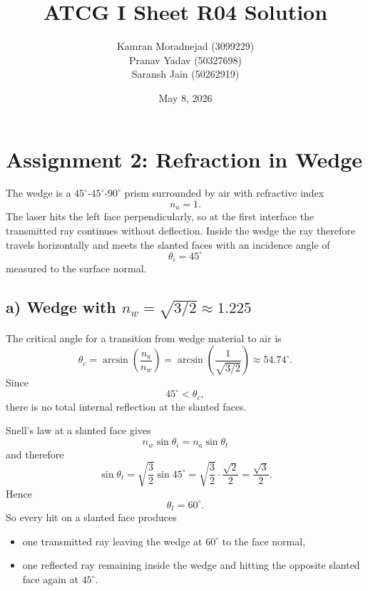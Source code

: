 \documentclass[a4paper,11pt]{article}
\title{ATCG I Sheet R04 Solution}
\author{
\large Kamran Moradnejad (3099229) \\
\large Pranav Yadav (50327698) \\
\large Saransh Jain (50262919)
}
\date{May 8, 2026}
\begin{document}
\maketitle

\section*{Assignment 2: Refraction in Wedge}
The wedge is a $45^\circ$-$45^\circ$-$90^\circ$ prism surrounded by air with refractive index
\[
n_a = 1.
\]
The laser hits the left face perpendicularly, so at the first interface the transmitted ray continues without deflection. Inside the wedge the ray therefore travels horizontally and meets the slanted faces with an incidence angle of
\[
\theta_i = 45^\circ
\]
measured to the surface normal.

\subsection*{a) Wedge with $n_w = \sqrt{3/2} \approx 1.225$}
The critical angle for a transition from wedge material to air is
\[
\theta_c = \arcsin\left(\frac{n_a}{n_w}\right)
= \arcsin\left(\frac{1}{\sqrt{3/2}}\right)
\approx 54.74^\circ.
\]
Since
\[
45^\circ < \theta_c,
\]
there is no total internal reflection at the slanted faces.

Snell's law at a slanted face gives
\[
n_w \sin\theta_i = n_a \sin\theta_t
\]
and therefore
\[
\sin\theta_t = \sqrt{\frac{3}{2}}\sin 45^\circ
= \sqrt{\frac{3}{2}}\cdot \frac{\sqrt{2}}{2}
= \frac{\sqrt{3}}{2}.
\]
Hence
\[
\theta_t = 60^\circ.
\]
So every hit on a slanted face produces
\begin{itemize}
    \item one transmitted ray leaving the wedge at $60^\circ$ to the face normal,
    \item one reflected ray remaining inside the wedge and hitting the opposite slanted face again at $45^\circ$.
\end{itemize}

\begin{center}
\end{center}
\end{document}
